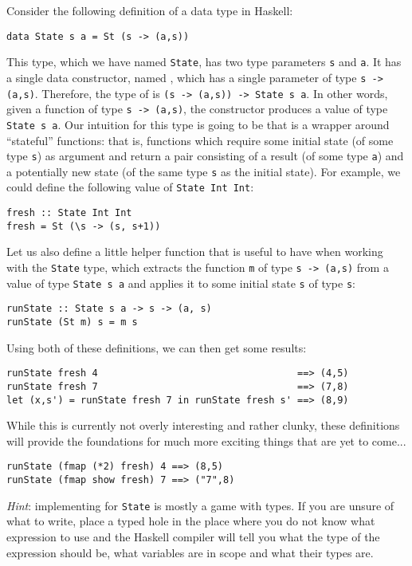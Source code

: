 \taskLine \pagebreak

Consider the following definition of a data type in Haskell:
\begin{verbatim}
data State s a = St (s -> (a,s))
\end{verbatim}
This type, which we have named \texttt{\small State}, has two type parameters \texttt{\small s} and \texttt{\small a}. It has a single data constructor, named , which has a single parameter of type \texttt{\small s -> (a,s)}. Therefore, the type of  is \texttt{\small (s -> (a,s)) -> State s a}. In other words, given a function of type \texttt{\small s -> (a,s)}, the  constructor produces a value of type \texttt{\small State s a}. Our intuition for this type is going to be that  is a wrapper around ``stateful'' functions: that is, functions which require some initial state (of some type \texttt{\small s}) as argument and return a pair consisting of a result (of some type \texttt{\small a}) and a potentially new state (of the same type \texttt{\small s} as the initial state). For example, we could define the following value of \texttt{\small State Int Int}:
\begin{verbatim}
fresh :: State Int Int 
fresh = St (\s -> (s, s+1))
\end{verbatim}
Let us also define a little helper function that is useful to have when working with the \texttt{\small State} type, which extracts the function \texttt{\small m} of type \texttt{\small s -> (a,s)} from a value of type \texttt{\small State s a} and applies it to some initial state \texttt{\small s} of type \texttt{\small s}:
\begin{verbatim}
runState :: State s a -> s -> (a, s)
runState (St m) s = m s
\end{verbatim}
Using both of these definitions, we can then get some results:
\begin{verbatim}
runState fresh 4                                   ==> (4,5)
runState fresh 7                                   ==> (7,8)
let (x,s') = runState fresh 7 in runState fresh s' ==> (8,9)
\end{verbatim}
While this is currently not overly interesting and rather clunky, these definitions will provide the foundations for much more exciting things that are yet to come...

\begin{verbatim}
runState (fmap (*2) fresh) 4 ==> (8,5) 
runState (fmap show fresh) 7 ==> ("7",8)
\end{verbatim}
\emph{Hint}: implementing  for \texttt{\small State} is mostly a game with types. If you are unsure of what to write, place a typed hole \haskellIn{_} in the place where you do not know what expression to use and the Haskell compiler will tell you what the type of the expression should be, what variables are in scope and what their types are.


